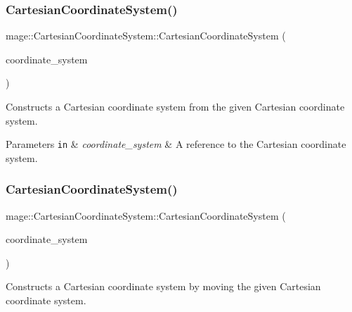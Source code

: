 \subsubsection{\texorpdfstring{Cartesian\+Coordinate\+System()}{CartesianCoordinateSystem()}\hspace{0.1cm}{\footnotesize\ttfamily [3/4]}}
{\footnotesize\ttfamily mage\+::\+Cartesian\+Coordinate\+System\+::\+Cartesian\+Coordinate\+System (\begin{DoxyParamCaption}\item[{const \hyperlink{structmage_1_1_cartesian_coordinate_system}{Cartesian\+Coordinate\+System} \&}]{coordinate\+\_\+system }\end{DoxyParamCaption})\hspace{0.3cm}{\ttfamily [default]}}

Constructs a Cartesian coordinate system from the given Cartesian coordinate system.


\begin{DoxyParams}[1]{Parameters}
\mbox{\tt in}  & {\em coordinate\+\_\+system} & A reference to the Cartesian coordinate system. \\
\hline
\end{DoxyParams}
\hypertarget{structmage_1_1_cartesian_coordinate_system_addc5cb01c6b990d1badb067da28e62bc}{}\label{structmage_1_1_cartesian_coordinate_system_addc5cb01c6b990d1badb067da28e62bc} 
\subsubsection{\texorpdfstring{Cartesian\+Coordinate\+System()}{CartesianCoordinateSystem()}\hspace{0.1cm}{\footnotesize\ttfamily [4/4]}}
{\footnotesize\ttfamily mage\+::\+Cartesian\+Coordinate\+System\+::\+Cartesian\+Coordinate\+System (\begin{DoxyParamCaption}\item[{\hyperlink{structmage_1_1_cartesian_coordinate_system}{Cartesian\+Coordinate\+System} \&\&}]{coordinate\+\_\+system }\end{DoxyParamCaption})\hspace{0.3cm}{\ttfamily [default]}}

Constructs a Cartesian coordinate system by moving the given Cartesian coordinate system.


